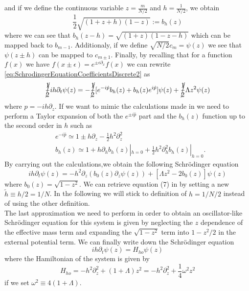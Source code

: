 and if we define the continuous variable $ z = \frac{m}{N/2} $  and $ h = \frac{1}{N/2} $, we obtain
\begin{equation}
\label{eq:CoefficientContinuous}
\frac{1}{2}
	\sqrt{ 
		\left(1 + z +h\right)
		\left(1 -z\right) 
	}
	:=  b_{h}(z)
\end{equation}
where we can see that $ b_{h}(z-h) = \sqrt{ \left(1 + z \right)\left(1 -z -h\right) } $ which can be mapped back to $ b_{m-1} $.
Additionaly, if we define $ \sqrt{N/2}  c_{m}= \psi(z) $ we see that $ \psi(z \pm h) $ can be mapped to $ c_{m\pm 1} $.
Finally, by recalling that for a function $f(x)$ we have $ f(x \pm \epsilon) = e^{\pm \epsilon\partial_{x}}f(x) $ we can rewrite \cref{eq:SchrodingerEquationCoefficientsDiscrete2} as 
\begin{equation}
\label{eq:SchrodingerEquationCoefficientsContinuous}
	\cancel{\frac{1}{2}}ih\partial_t\psi(z) = 
	-\cancel{\frac{1}{2}}[ e^{-i\hat{p}} b_{h}(z) + b_{h}(z)e^{i\hat{p}} ]\psi(z) +
	\cancel{\frac{1}{2}}\Lambda z^2 \psi(z)
\end{equation}
where $ \hat{p} = -ih\partial_z $.
If we want to mimic the calculations made in \cite{FastGenerationJulia2012} we need to perform a Taylor expansion of both the $ e^{\pm i\hat{p}} $ part and the $ b_{h}(z) $ function up to the second order in $ h $ such as
\begin{align}
&	e^{-i\hat{p}}  \simeq 1 \pm h \partial_{z} - \frac{1}{2}h^2\partial^2_{z} \label{eq:TaylorExpansionExp }\\
&	 b_{h}(z) \simeq  1 + h \partial_{h}b_{h}(z)|_{h = 0} + \frac{1}{2}h^2\partial_h^2b_{h}(z)|_{h = 0} \label{eq:TaylorExpansionB }.
\end{align}
By carrying out the calculations,we obtain the following Schr{\"o}dinger equation
\begin{equation}
\label{eq:TaylorExpansionHamiltonian}
	ih\partial_t\psi(z) = 
	-h^2\partial_z\left(b_{0}(z)\partial_z\psi(z) \right)+
	\left[ 	\Lambda z^2 - 2b_{0}(z) \right] \psi(z)
\end{equation}
where $ b_{0}(z) = \sqrt{1-z^2}  $.
We can retrieve equation (7) in \cite{FastGenerationJulia2012} by setting a new $ \tilde{h} \equiv h/2 = 1/N $.
In the following we will stick to definition of $ h = 1/N/2 $ instead of using the other definition.\\
The last approximation we need to perform in order to obtain an oscillator-like Schr{\"o}dinger equation for this system is given by neglecting the $ z $ dependence of the effective mass term and expanding the $ \sqrt{1 - z^2}  $ term into $ 1 - z^2/2 $ in the external potential term. We can finally write down the Schr{\"o}dinger equation 
\begin{equation} 
\label{eq:SchrodingerEquationHarmonicLike}
	ih\partial_t\psi(z) = H_{ho}\psi(z)
\end{equation}
where the Hamiltonian of the system is given by 
\begin{equation}
\label{eq:HamiltonianJosephsonJunctionHarmonic}
	H_{ho} = -h^2\partial_z^2 + (1 + \Lambda)z^2  = 
	 -h^2\partial_z^2 + \frac{1}{4}\omega^2 z^2  
\end{equation}
if we set $ \omega^2 \equiv 4(1+\Lambda) $.
